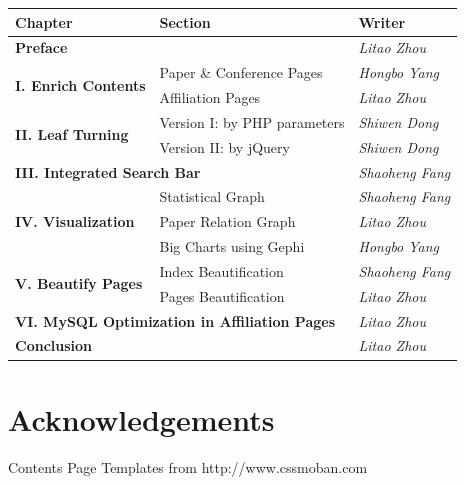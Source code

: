 \documentclass{book}
\begin{document}
\begin{table}[H]
\begin{tabular}{lll}
\hline
\textbf{Chapter}                             & \textbf{Section}             & \textbf{Writer}        \\ \hline
\multicolumn{2}{l}{\textbf{Preface}}                                        & \textit{Litao Zhou}    \\
\multirow{2}{*}{\textbf{I. Enrich Contents}} & Paper \& Conference Pages    & \textit{Hongbo Yang}   \\
                                             & Affiliation Pages            & \textit{Litao Zhou}    \\
\multirow{2}{*}{\textbf{II. Leaf Turning}}   & Version I: by PHP parameters & \textit{Shiwen Dong}   \\
                                             & Version II: by jQuery        & \textit{Shiwen Dong}   \\
\multicolumn{2}{l}{\textbf{III. Integrated Search Bar}}                     & \textit{Shaoheng Fang} \\
\multirow{3}{*}{\textbf{IV. Visualization}}  & Statistical Graph            & \textit{Shaoheng Fang} \\
                                             & Paper Relation Graph         & \textit{Litao Zhou}    \\
                                             & Big Charts using Gephi       & \textit{Hongbo Yang}   \\
\multirow{2}{*}{\textbf{V. Beautify Pages}}  & Index Beautification         & \textit{Shaoheng Fang} \\
                                             & Pages Beautification         & \textit{Litao Zhou}    \\
\multicolumn{2}{l}{\textbf{VI. MySQL Optimization in Affiliation Pages}}    & \textit{Litao Zhou}    \\
\multicolumn{2}{l}{\textbf{Conclusion}}                                     & \textit{Litao Zhou}    \\ \hline
\end{tabular}
\end{table}

\section*{Acknowledgements}

Contents Page Templates from http://www.cssmoban.com
\end{document}
